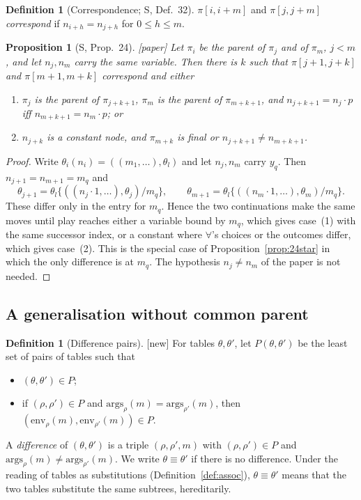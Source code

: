 \documentclass[11pt]{article}
\newcommand{\suc}[2]{#1{\cdot}#2}
\newcommand{\iv}[2]{\pi[#1,#2]}
\newcommand{\args}{\mathrm{args}}
\newcommand{\env}{\mathrm{env}}
\newcommand{\Paper}{\textsf{[paper]}}
\newcommand{\New}{\textsf{[new]}}
\theoremstyle{plain}
\newtheorem{proposition}[theorem]{Proposition}
\theoremstyle{definition}
\newtheorem{definition}[theorem]{Definition}
\theoremstyle{remark}
\begin{document}
\begin{definition}[Correspondence; S, Def.~32]
$\iv i{i+m}$ and $\iv j{j+m}$ \emph{correspond} if $n_{i+h}=n_{j+h}$ for
$0\le h\le m$.
\end{definition}

\begin{proposition}[S, Prop.~24]\label{prop:24}
\Paper{} Let $\pi_i$ be the parent of $\pi_j$ and of $\pi_m$, $j<m$, and
let $n_j,n_m$ carry the same variable.  Then there is $k$ such that
$\iv{j+1}{j+k}$ and $\iv{m+1}{m+k}$ correspond and either
\begin{enumerate}
\item[(1)] $\pi_j$ is the parent of $\pi_{j+k+1}$, $\pi_m$ is the parent of
  $\pi_{m+k+1}$, and $n_{j+k+1}=\suc{n_j}p$ iff $n_{m+k+1}=\suc{n_m}p$; or
\item[(2)] $n_{j+k}$ is a constant node, and $\pi_{m+k}$ is final or
  $n_{j+k+1}\ne n_{m+k+1}$.
\end{enumerate}
\end{proposition}
\begin{proof}
Write $\theta_i(n_i)=((m_1,\dots),\theta_l)$ and let $n_j,n_m$ carry $y_q$.
Then $n_{j+1}=n_{m+1}=m_q$ and
\[
\theta_{j+1}=\theta_l\{((\suc{n_j}1,\dots),\theta_j)/m_q\},\qquad
\theta_{m+1}=\theta_l\{((\suc{n_m}1,\dots),\theta_m)/m_q\}.
\]
These differ only in the entry for $m_q$.  Hence the two continuations
make the same moves until play reaches either a variable bound by
$m_q$, which gives case~(1) with the same successor index, or a
constant where $\forall$'s choices or the outcomes differ, which gives
case~(2).  This is the special case of Proposition~\ref{prop:24star} in
which the only difference is at $m_q$.  The hypothesis $n_j\ne n_m$ of
the paper is not needed.
\end{proof}

\subsection{A generalisation without common parent}

\begin{definition}[Difference pairs]\label{def:diff}
\New{} For tables $\theta,\theta'$, let $P(\theta,\theta')$ be the least
set of pairs of tables such that
\begin{itemize}
\item $(\theta,\theta')\in P$;
\item if $(\rho,\rho')\in P$ and $\args_\rho(m)=\args_{\rho'}(m)$, then
  $(\env_\rho(m),\env_{\rho'}(m))\in P$.
\end{itemize}
A \emph{difference} of $(\theta,\theta')$ is a triple $(\rho,\rho',m)$ with
$(\rho,\rho')\in P$ and $\args_\rho(m)\ne\args_{\rho'}(m)$.  We write
$\theta\equiv\theta'$ if there is no difference.  Under the reading of
tables as substitutions (Definition~\ref{def:assoc}), $\theta\equiv\theta'$
means that the two tables substitute the same subtrees, hereditarily.
\end{definition}
\end{document}
